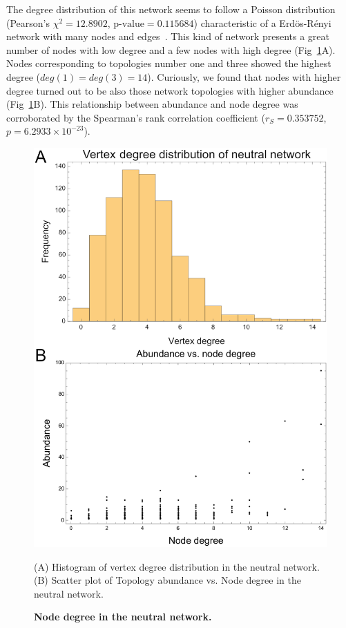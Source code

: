 \documentclass[10pt,letterpaper]{article}
\begin{document}
The degree distribution of this network seems to follow a Poisson distribution
(Pearson’s $\chi^2 = 12.8902$, $\text{p-value} = 0.115684$) characteristic of a
Erdös-Rényi network with many nodes and edges~\cite{Erdos1959}. This kind of
network presents a great
number of nodes with low degree and a few nodes with high degree
(Fig~\ref{fig:deg-dist}A). Nodes corresponding to topologies number one and
three showed the highest degree ($deg(1) = deg (3) = 14$). Curiously, we found
that nodes with higher degree turned out to be also those network topologies
with higher abundance
(Fig~\ref{fig:deg-dist}B). This relationship between abundance and node degree
was corroborated by the Spearman's rank correlation coefficient
($r_S = 0.353752$, $p = 6.2933\times10^{-23} $).

\begin{figure}[!h]
 \includegraphics[width=\textwidth]{figures/results/Fig4}
 \caption{\bf Node degree in the neutral network.}
 (A) Histogram of vertex degree distribution in the neutral network.
 (B) Scatter plot of Topology abundance vs. Node degree in the neutral
 network.
 \label{fig:deg-dist}
\end{figure}
\end{document}
